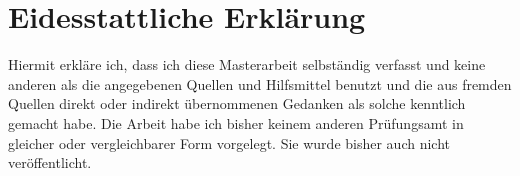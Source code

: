 \thispagestyle{empty}
\par
\chapter*{Eidesstattliche Erklärung}

Hiermit erkläre ich, dass ich diese Masterarbeit selbständig verfasst und keine anderen als die angegebenen Quellen und Hilfsmittel benutzt und die aus fremden Quellen direkt oder indirekt übernommenen Gedanken als solche kenntlich gemacht habe. Die Arbeit habe ich bisher keinem anderen Prüfungsamt in gleicher oder vergleichbarer Form vorgelegt. Sie wurde bisher auch nicht veröffentlicht.



\clearpage






